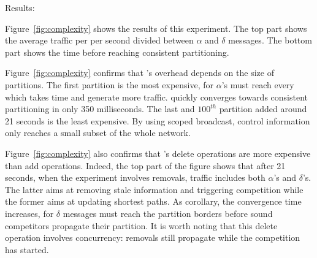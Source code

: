 \begin{asparadesc}
\begin{figure}
\end{figure}

\item [Results:]

Figure~\ref{fig:complexity} shows the results of this experiment. The
top part shows the average traffic per \process per second divided
between $\alpha$ and $\delta$ messages. The bottom part shows the time
before reaching consistent partitioning.

\noindent Figure~\ref{fig:complexity} confirms that \NAME's overhead
depends on the size of partitions. The first partition is the most
expensive, for $\alpha$'s must reach every \process which takes time
and generate more traffic.  \NAME quickly converges towards consistent
partitioning in only 350 milliseconds. The last and $100^{th}$
partition added around 21 seconds is the least expensive. By using
scoped broadcast, control information only reaches a small subset of
the whole network.

\noindent Figure~\ref{fig:complexity} also confirms that \NAME's
delete operations are more expensive than add operations. Indeed, the
top part of the figure shows that after 21 seconds, when the
experiment involves removals, traffic includes both $\alpha$'s and
$\delta$'s. The latter aims at removing stale information and
triggering competition while the former aims at updating shortest
paths. As corollary, the convergence time increases, for $\delta$
messages must reach the partition borders before sound competitors
propagate their partition. It is worth noting that this delete
operation involves concurrency: removals still propagate while
the competition has started. %




\end{asparadesc}
